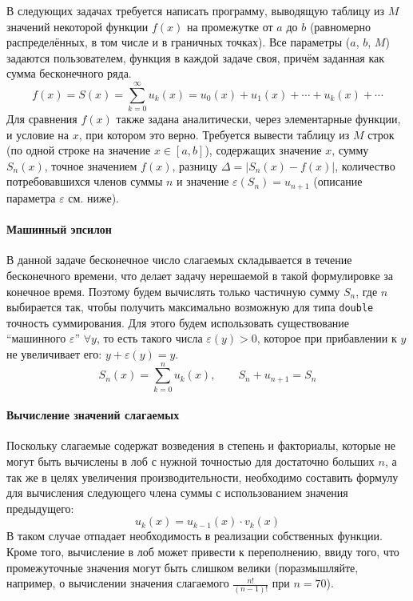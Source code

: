 
В следующих задачах требуется написать программу, выводящую таблицу из $M$
значений некоторой функции $f(x)$ на промежутке от $a$ до $b$ (равномерно распределённых, в том числе и в
граничных точках). Все параметры ($a$, $b$, $M$) задаются пользователем,
функция в каждой задаче своя, причём заданная как сумма бесконечного ряда.
%
\[
  f(x)=S(x)=\sum_{k=0}^\infty u_k(x)=u_0(x)+u_1(x)+\cdots+u_k(x)+\cdots
\]
%
Для сравнения $f(x)$ также задана аналитически, через элементарные функции, и
условие на $x$, при котором это верно. Требуется вывести таблицу из $M$ строк
(по одной строке на значение $x \in [a,b]$), содержащих значение $x$, сумму
$S_n(x)$, точное значением $f(x)$, разницу $\Delta = |S_n(x) - f(x)|$,
количество потребовавшихся членов суммы $n$ и значение
$\varepsilon(S_n)=u_{n+1}$ (описание параметра $\varepsilon$ см. ниже).


\zzsectionCOMMENTS


\paragraph{Машинный эпсилон}
В данной задаче бесконечное число слагаемых складывается в течение бесконечного
времени, что делает задачу нерешаемой в такой формулировке за конечное время. 
Поэтому будем вычислять только частичную сумму $S_n$, где $n$ выбирается так,
чтобы получить максимально возможную для типа \texttt{double} точность
суммирования. Для этого будем использовать существование ``машинного
$\varepsilon$'' $\forall y$, то есть такого числа $\varepsilon(y) > 0$, которое при
прибавлении к $y$ не увеличивает его: $y + \varepsilon(y) = y$.
%
\[
S_n(x)=\sum_{k=0}^n u_k(x),\qquad S_n + u_{n+1} = S_n
\]

\paragraph{Вычисление значений слагаемых}
Поскольку слагаемые содержат возведения в степень и факториалы, которые не
могут быть вычислены в лоб с нужной точностью для достаточно больших $n$, а так же в целях увеличения производительности, необходимо составить формулу для вычисления следующего члена суммы с использованием значения предыдущего:
%
\[
u_k(x) = u_{k-1}(x)\cdot v_k(x)
\]
%
В таком случае отпадает необходимость в реализации собственных функции. Кроме того, вычисление в лоб может привести к переполнению, ввиду того, что промежуточные значения могут быть слишком велики (поразмышляйте, например, о вычислении значения слагаемого $\frac{n!}{(n-1)!}$ при $n = 70$).

